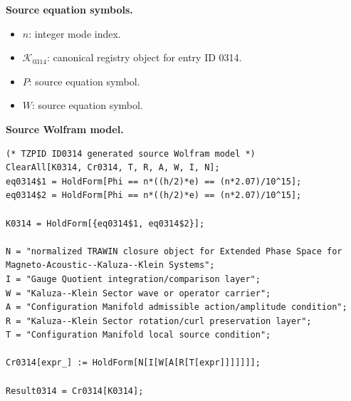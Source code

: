 \begin{minipage}[t]{0.49\linewidth}
\begingroup
\small
\raggedright
\textbf{Source equation symbols.}\par
\begin{itemize}[leftmargin=1.35em,itemsep=1pt,topsep=1pt,parsep=0pt]
    \item $n$: integer mode index.
    \item $\mathcal{K}_{0314}$: canonical registry object for entry ID 0314.
    \item $P$: source equation symbol.
    \item $W$: source equation symbol.
\end{itemize}
\endgroup
\end{minipage}\hfill
\begin{minipage}[t]{0.47\linewidth}
\begingroup
\scriptsize
\raggedright
\textbf{Source Wolfram model.}\par
\begin{Verbatim}[fontsize=\tiny,breaklines=true,breakanywhere=true]
(* TZPID ID0314 generated source Wolfram model *)
ClearAll[K0314, Cr0314, T, R, A, W, I, N];
eq0314$1 = HoldForm[Phi == n*((h/2)*e) == (n*2.07)/10^15];
eq0314$2 = HoldForm[Phi == n*((h/2)*e) == (n*2.07)/10^15];

K0314 = HoldForm[{eq0314$1, eq0314$2}];

N = "normalized TRAWIN closure object for Extended Phase Space for Magneto-Acoustic--Kaluza--Klein Systems";
I = "Gauge Quotient integration/comparison layer";
W = "Kaluza--Klein Sector wave or operator carrier";
A = "Configuration Manifold admissible action/amplitude condition";
R = "Kaluza--Klein Sector rotation/curl preservation layer";
T = "Configuration Manifold local source condition";

Cr0314[expr_] := HoldForm[N[I[W[A[R[T[expr]]]]]]];

Result0314 = Cr0314[K0314];
\end{Verbatim}
\endgroup
\end{minipage}

